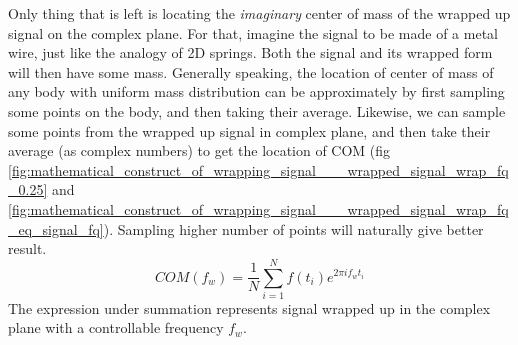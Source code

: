 \documentclass[11pt, a4paper]{article}
\newcommand{\quotedsingle}[1]{#1}	%
\newcommand{\quotedsingleit}[1]{\quotedsingle{\textit{#1}}}	%
\begin{document}
	Only thing that is left is locating the \quotedsingleit{imaginary} center of mass of the wrapped up signal on the complex plane. For that, imagine the signal to be made of a metal wire, just like the analogy of 2D springs. Both the signal and its wrapped form will then have some mass. Generally speaking, the location of center of mass of any body with uniform mass distribution can be approximately by first sampling some points on the body, and then taking their average. Likewise, we can sample some points from the wrapped up signal in complex plane, and then take their average (as complex numbers) to get the location of COM (fig \ref{fig:mathematical_construct_of_wrapping_signal___wrapped_signal_wrap_fq_0.25} and \ref{fig:mathematical_construct_of_wrapping_signal___wrapped_signal_wrap_fq_eq_signal_fq}). Sampling higher number of points will naturally give better result.
	\begin{equation}\label{eq:com.wrapped_signal.approx_summation_form}
		COM(f_{w}) = \frac{1}{N} \sum_{i=1}^{N} f(t_{i})e^{2\pi if_{w}t_{i}}
	\end{equation}
	The expression under summation represents signal wrapped up in the complex plane with a controllable frequency $f_{w}$. 
	
\end{document}
